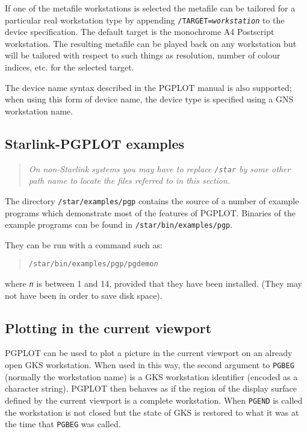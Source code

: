\documentclass[twoside,11pt]{article}
\newcommand{\xref}[3]{#1}
\newcommand{\xlabel}[1]{}
\renewcommand{\_}{\texttt{\symbol{95}}}
\begin{document}
If one of the metafile workstations is selected the metafile can be
tailored for a particular real workstation type by appending
\texttt{/TARGET=\emph{workstation}} to the device specification.  The
default target is the monochrome A4 Postscript workstation. The
resulting metafile can be played back on any workstation but will be
tailored with respect to such things as resolution, number of colour
indices, etc. for the selected target.

The device name syntax described in the PGPLOT manual is also
supported; when using this form of device name, the device type is
specified using a GNS workstation name.

\subsection{\xlabel{starlink-pgplot_examples}Starlink-PGPLOT examples}
\label{starlink-pgplot_examples}

\begin{quote}
\emph{ On non-Starlink systems you may have to replace \texttt{/star} by 
some other path name to locate the files referred to in this section.}
\end{quote}

The directory \texttt{/star/examples/pgp} contains the source of a
number of example programs which demonstrate most of the features of
PGPLOT.  Binaries of the example programs can be found in
\texttt{/star/bin/examples/pgp}.

They can be run with a command such as:

\begin{quote}
\texttt{/star/bin/examples/pgp/pgdemo{\emph{n}}}
\end{quote}

where \texttt{\emph{n}} is between 1 and 14, provided that they have
been installed.  (They may not have been in order to save disk space).

\subsection{\xlabel{plotting_in_the_current_viewport} %
Plotting in the current viewport}
\label{plotting_in_the_current_viewport}
\label{viewport}

PGPLOT can be used to plot a picture in the current viewport on an
already open GKS workstation. When used in this way, the second
argument to \xref{\texttt{PGBEG}}{sun15}{PGBEG} (normally the workstation
name) is a GKS workstation identifier (encoded as a character string).
PGPLOT then behaves as if the region of the display surface defined by
the current viewport is a complete workstation.  When
\xref{\texttt{PGEND}}{sun15}{PGEND} is called the workstation is not closed
but the state of GKS is restored to what it was at the time that
\texttt{PGBEG} was called.
\end{document}
